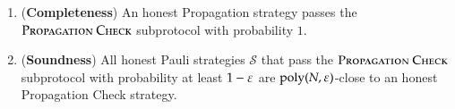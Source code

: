 \begin{lemma}	
\label{lem:prop_check}
\begin{enumerate}
\item (\textbf{Completeness}) An honest Propagation strategy passes the $\textsc{Propagation Check}$ subprotocol with probability $1$. 
\item (\textbf{Soundness}) All honest Pauli strategies $\mathcal{S}$ that pass the $\textsc{Propagation Check}$ subprotocol with probability at least $1 - \varepsilon$ are $\operatorname{poly}(N,\varepsilon)$-close to an honest Propagation Check strategy.  
\end{enumerate}
\end{lemma}
